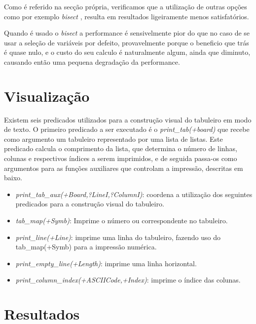 \documentclass{llncs}
\begin{document}
Como \'{e} referido na sec\c{c}\~{a}o pr\'{o}pria, verificamos que a utiliza\c{c}\~{a}o de outras op\c{c}\~{o}es como por exemplo \emph{bisect} , resulta em resultados ligeiramente menos satisfat\'{o}rios.

Quando \'{e} usado o \emph{bisect} a performance \'{e} sensivelmente pior do que no caso de se usar a sele\c{c}\~{a}o de vari\'{a}veis por defeito, provavelmente porque o beneficio que tr\'{a}s \'{e} quase nulo, e o custo do seu calculo \'{e} naturalmente algum, ainda que diminuto, causando ent\~{a}o uma pequena degrada\c{c}\~{a}o da performance.

\section{Visualiza\c{c}\~{a}o}
%
Existem seis predicados utilizados para a constru\c{c}\~{a}o visual do tabuleiro em modo de texto. O primeiro predicado a ser executado \'{e} o \textit{print\_tab(+board)} que recebe como argumento um tabuleiro representado por uma lista de listas. Este predicado calcula o comprimento da lista, que determina o n\'{u}mero de linhas, colunas e respectivos \'{i}ndices a serem imprimidos, e de seguida passa-os como argumentos  para as fun\c{c}\~{o}es auxiliares que controlam a impress\~{a}o, descritas em baixo.

\begin{itemize}
\item \textit{print\_tab\_aux(+Board,?LineI,?ColumnI)}: coordena a utiliza\c{c}\~{a}o dos seguintes predicados para a constru\c{c}\~{a}o visual do tabuleiro.
\item \textit{tab\_map(+Symb)}: Imprime o n\'{u}mero ou correspondente no tabuleiro.
\item \textit{print\_line(+Line)}: imprime uma linha do tabuleiro, fazendo uso do tab\_map(+Symb) para a impress\~{a}o num\'{e}rica.
\item \textit{print\_empty\_line(+Length)}: imprime uma linha horizontal.
\item \textit{print\_column\_index(+ASCIICode,+Index)}: imprime o \'{i}ndice das colunas.
\end{itemize}


\section{Resultados}
\end{document}

